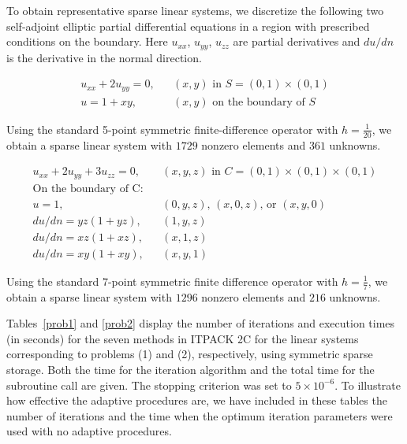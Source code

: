 To obtain representative sparse linear systems, we discretize the
following two self-adjoint elliptic partial differential equations in a
region with prescribed conditions on the boundary.  Here $u_{xx}$,
$u_{yy}$, $u_{zz}$ are partial derivatives and $du/dn$ is the derivative 
in the normal direction.
 
\begin{eqnarray}
     u_{xx} + 2u_{yy} = 0, && \mbox{$(x,y)$ in $S=(0,1)\times (0,1)$} \\
             u = 1 + xy,   && \mbox{$(x,y)$ on the boundary of $S$} 
                             \nonumber
\end{eqnarray}

\noindent
Using the standard 5-point symmetric finite-difference operator with 
$h=\frac{1}{20}$, we obtain a sparse linear system with $1729$ nonzero 
elements and $361$ unknowns.
 
\begin{eqnarray}
    u_{xx}+2u_{yy}+3u_{zz}=0, && \mbox{$(x,y,z)$ in 
                     $C=(0,1)\times (0,1)\times (0,1)$} \nonumber \\
    \mbox{On the boundary of C:} && \\
      u=1, && \mbox{$(0,y,z)$, $(x,0,z)$, or $(x,y,0)$} \nonumber \\
      du/dn = yz(1 + yz), && (1,y,z) \nonumber \\
      du/dn = xz(1 + xz), && (x,1,z) \nonumber \\
      du/dn = xy(1 + xy), && (x,y,1) \nonumber 
\end{eqnarray}
 
\noindent 
Using the standard 7-point symmetric finite difference operator with 
$h=\frac{1}{7}$, we obtain a sparse linear system with $1296$ nonzero 
elements and $216$ unknowns.
 
Tables~\ref{prob1} and \ref{prob2} display the number of iterations and 
execution times (in seconds) for the seven methods in ITPACK 2C for the 
linear systems corresponding to problems (1) and (2), respectively, using 
symmetric sparse storage.  Both the time for the iteration algorithm and 
the total time for the subroutine call are given.  The stopping criterion 
was set to $5\times 10^{-6}$.  To illustrate how effective the adaptive 
procedures are, we have included in these tables the number of iterations 
and the time when the optimum iteration parameters were used with no 
adaptive procedures.

